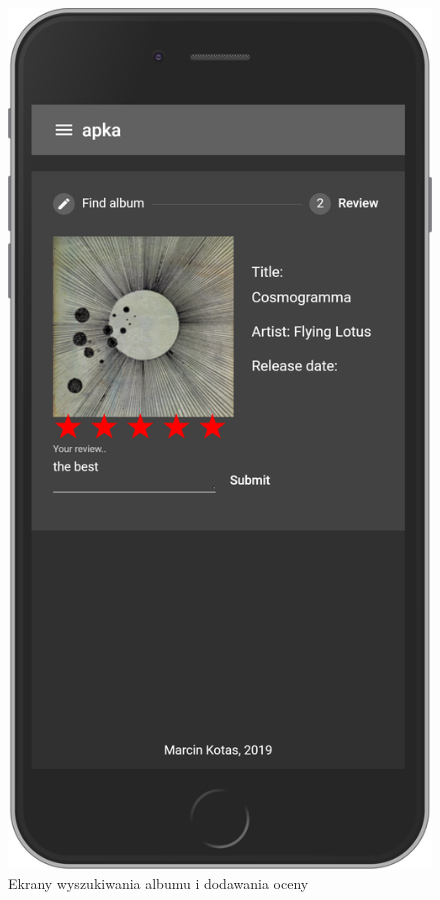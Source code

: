 \begin{figure}[H]
		\begin{minipage}{0.5\textwidth}
			\includegraphics[width=0.9\linewidth]{rys06/rate.png}
		\end{minipage}
		\caption{Ekrany wyszukiwania albumu i dodawania oceny}
		\label{fig:rating}
	\end{figure}
	

